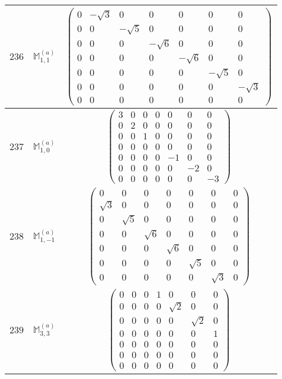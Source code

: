 \documentclass[fleqn,8pt,landscape]{jsarticle}
\begin{document}
\begin{center}
\begin{longtable}{ccc}
$ 236 $ & $ \mathbb{M}_{1,1}^{(a)} $ & $ \begin{pmatrix} 0 & - \sqrt{3} & 0 & 0 & 0 & 0 & 0 \\ 0 & 0 & - \sqrt{5} & 0 & 0 & 0 & 0 \\ 0 & 0 & 0 & - \sqrt{6} & 0 & 0 & 0 \\ 0 & 0 & 0 & 0 & - \sqrt{6} & 0 & 0 \\ 0 & 0 & 0 & 0 & 0 & - \sqrt{5} & 0 \\ 0 & 0 & 0 & 0 & 0 & 0 & - \sqrt{3} \\ 0 & 0 & 0 & 0 & 0 & 0 & 0 \end{pmatrix} $ \\ \hline
$ 237 $ & $ \mathbb{M}_{1,0}^{(a)} $ & $ \begin{pmatrix} 3 & 0 & 0 & 0 & 0 & 0 & 0 \\ 0 & 2 & 0 & 0 & 0 & 0 & 0 \\ 0 & 0 & 1 & 0 & 0 & 0 & 0 \\ 0 & 0 & 0 & 0 & 0 & 0 & 0 \\ 0 & 0 & 0 & 0 & -1 & 0 & 0 \\ 0 & 0 & 0 & 0 & 0 & -2 & 0 \\ 0 & 0 & 0 & 0 & 0 & 0 & -3 \end{pmatrix} $ \\ \hline
$ 238 $ & $ \mathbb{M}_{1,-1}^{(a)} $ & $ \begin{pmatrix} 0 & 0 & 0 & 0 & 0 & 0 & 0 \\ \sqrt{3} & 0 & 0 & 0 & 0 & 0 & 0 \\ 0 & \sqrt{5} & 0 & 0 & 0 & 0 & 0 \\ 0 & 0 & \sqrt{6} & 0 & 0 & 0 & 0 \\ 0 & 0 & 0 & \sqrt{6} & 0 & 0 & 0 \\ 0 & 0 & 0 & 0 & \sqrt{5} & 0 & 0 \\ 0 & 0 & 0 & 0 & 0 & \sqrt{3} & 0 \end{pmatrix} $ \\ \hline
$ 239 $ & $ \mathbb{M}_{3,3}^{(a)} $ & $ \begin{pmatrix} 0 & 0 & 0 & 1 & 0 & 0 & 0 \\ 0 & 0 & 0 & 0 & \sqrt{2} & 0 & 0 \\ 0 & 0 & 0 & 0 & 0 & \sqrt{2} & 0 \\ 0 & 0 & 0 & 0 & 0 & 0 & 1 \\ 0 & 0 & 0 & 0 & 0 & 0 & 0 \\ 0 & 0 & 0 & 0 & 0 & 0 & 0 \\ 0 & 0 & 0 & 0 & 0 & 0 & 0 \end{pmatrix} $ \\ \hline

\end{longtable}
\end{center}
\end{document}

